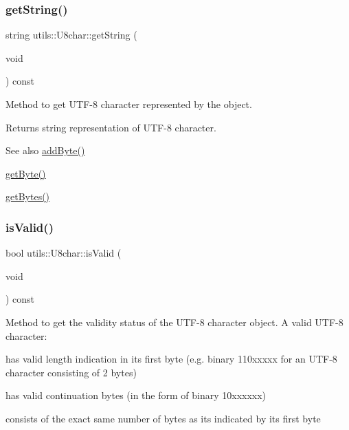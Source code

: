 \subsubsection{\texorpdfstring{get\+String()}{getString()}}
{\footnotesize\ttfamily string utils\+::\+U8char\+::get\+String (\begin{DoxyParamCaption}\item[{void}]{ }\end{DoxyParamCaption}) const}

Method to get U\+T\+F-\/8 character represented by the object. \begin{DoxyReturn}{Returns}
string representation of U\+T\+F-\/8 character. 
\end{DoxyReturn}
\begin{DoxySeeAlso}{See also}
\hyperlink{classutils_1_1U8char_a749ac883897f455715be1083ed1c80dd}{add\+Byte()} 

\hyperlink{classutils_1_1U8char_af23db23219f81cfcc9424a7dbde981d9}{get\+Byte()} 

\hyperlink{classutils_1_1U8char_a9bf39a597d04b56faac3325eebf49b39}{get\+Bytes()} 
\end{DoxySeeAlso}
\mbox{\label{classutils_1_1U8char_af33db5c6613954da27e484af82217feb}} 
\subsubsection{\texorpdfstring{is\+Valid()}{isValid()}}
{\footnotesize\ttfamily bool utils\+::\+U8char\+::is\+Valid (\begin{DoxyParamCaption}\item[{void}]{ }\end{DoxyParamCaption}) const}

Method to get the validity status of the U\+T\+F-\/8 character object. A valid U\+T\+F-\/8 character\+:
\begin{DoxyItemize}
\item has valid length indication in its first byte (e.\+g. binary 110xxxxx for an U\+T\+F-\/8 character consisting of 2 bytes)
\item has valid continuation bytes (in the form of binary 10xxxxxx)
\item consists of the exact same number of bytes as it\textquotesingle{}s indicated by its first byte
\end{DoxyItemize}

